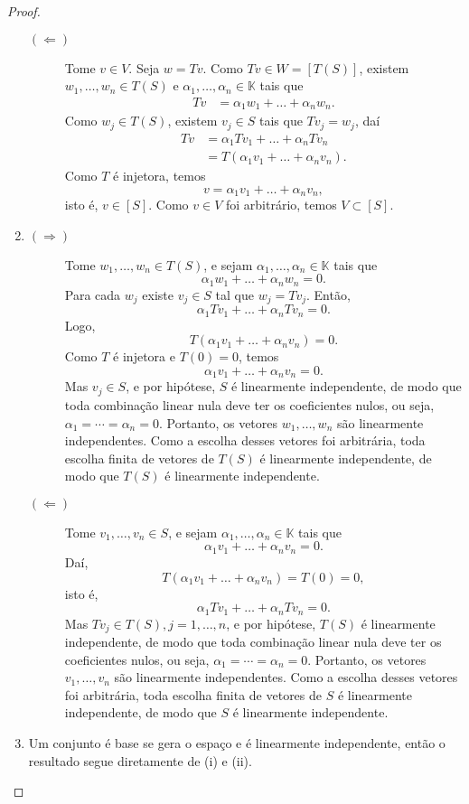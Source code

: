 \documentclass{article}
\newcommand{\K}{\mathbb{K}}
\begin{document}
\begin{proof}
\begin{enumerate}
\begin{description}
      \item[$(\Leftarrow)$]
        Tome $v\in V$. Seja $w=Tv$. Como
        $Tv\in W=[T(S)]$, existem $w_1,\dots,w_n\in T(S)$ e
        $\alpha_1,\dots,\alpha_n\in\K$ tais que
        \begin{align*}
          Tv & = \alpha_1w_1+\dots+\alpha_nw_n.
        \end{align*}
        Como $w_j\in T(S)$, existem $v_j\in S$ tais que
        $Tv_j = w_j$, daí
        \begin{align*}
          Tv & = \alpha_1Tv_1+\dots+\alpha_nTv_n \\
          & = T(\alpha_1v_1+\dots+\alpha_nv_n).
        \end{align*}
        Como $T$ é injetora, temos
        $$ v = \alpha_1v_1 + \dots + \alpha_nv_n, $$
        isto é, $v\in [S]$. Como $v\in V$ foi arbitrário, temos
        $V\subset[S]$.
    \end{description}
    \item
    \begin{description}
      \item[$(\Rightarrow)$]
        Tome $w_1,\dots,w_n \in T(S)$, e sejam
        $\alpha_1,\dots,\alpha_n\in\K$ tais que
        $$ \alpha_1w_1 + \dots + \alpha_nw_n = 0.$$
        Para cada $w_j$ existe $v_j\in S$ tal que $w_j = Tv_j$.
        Então,
        $$ \alpha_1Tv_1 + \dots + \alpha_nTv_n = 0.$$
        Logo,
        $$ T(\alpha_1v_1 + \dots + \alpha_nv_n) = 0.$$
        Como $T$ é injetora e $T(0) = 0$, temos
        $$ \alpha_1v_1 + \dots + \alpha_nv_n = 0. $$
        Mas $v_j\in S$, e por hipótese, $S$ é linearmente independente,
        de modo que toda combinação linear nula deve
        ter os coeficientes nulos, ou seja,
        $\alpha_1 = \cdots = \alpha_n = 0$.
        Portanto, os vetores $w_1,\dots,w_n$ são linearmente independentes.
        Como a escolha desses vetores foi arbitrária, toda escolha finita de
        vetores de $T(S)$ é linearmente independente, de modo que $T(S)$ é
        linearmente independente.

      \item[$(\Leftarrow)$]
        Tome $v_1,\dots,v_n \in S$, e sejam
        $\alpha_1,\dots,\alpha_n\in\K$ tais que
        $$ \alpha_1v_1 + \dots + \alpha_nv_n = 0.$$
        Daí,
        $$ T(\alpha_1v_1 + \dots + \alpha_nv_n) = T(0) = 0,$$
        isto é,
        $$ \alpha_1Tv_1 + \dots + \alpha_nTv_n = 0.$$
        Mas $Tv_j\in T(S), j=1,\dots,n$, e por hipótese, $T(S)$ é linearmente
        independente,
        de modo que toda combinação linear nula deve
        ter os coeficientes nulos, ou seja,
        $\alpha_1 = \cdots = \alpha_n = 0$.
        Portanto, os vetores $v_1,\dots,v_n$ são linearmente independentes.
        Como a escolha desses vetores foi arbitrária, toda escolha finita de
        vetores de $S$ é linearmente independente, de modo que $S$ é
        linearmente independente.
    \end{description}
    \item Um conjunto é base se gera o espaço e é linearmente independente,
      então o resultado segue diretamente de (i) e (ii).
  \end{enumerate}
\end{proof}
\end{document}
